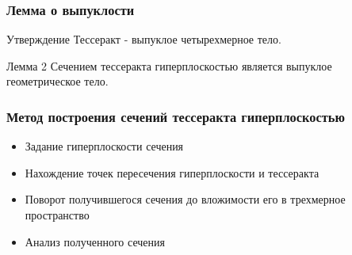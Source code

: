 \documentclass[10pt,pdf,hyperref={unicode}]{beamer}
\begin{document}
\begin{frame}
	\frametitle{Лемма о выпуклости}

	\begin{alertblock}{Утверждение}
		Тессеракт - выпуклое четырехмерное тело.
	\end{alertblock}

	\begin{block}{Лемма 2}
		Сечением тессеракта гиперплоскостью является выпуклое геометрическое тело.
	\end{block}
\end{frame}
\begin{frame}
	\frametitle{Метод построения сечений тессеракта гиперплоскостью}
	\begin{itemize}
		\item Задание гиперплоскости сечения
		\item Нахождение точек пересечения гиперплоскости и тессеракта
		\item Поворот получившегося сечения до вложимости его в трехмерное пространство
		\item Анализ полученного сечения
	\end{itemize}
\end{frame}
\end{document}
